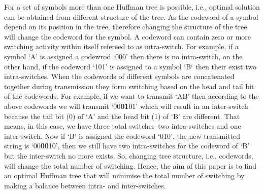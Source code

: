 \documentclass[preprint,12pt]{elsarticle}
\begin{document}
For a set of symbols more than one Huffman tree is possible, i.e., optimal solution can be obtained from different structure of the tree. As the codeword of a symbol depend on its position in the tree, therefore changing the structure of the tree will change the codeword for the symbol. A codeword can contain zero or more switching activity within itself refereed to as intra-switch. For example, if a symbol `A' is assigned a codewrod `000' then there is no intra-switch, on the other hand, if the codeword `101' is assigned to a symbol `B` then their exist two intra-switches. When the codewords of different symbols are concatenated together during transmission they form switching based on the head and tail bit of the codewords. For example, if we want to transmit `AB' then according to the above codewords we will transmit `00\textbf{01}01' which will result in an inter-switch because the tail bit (0) of `A' and the head bit (1) of `B' are different. That means, in this case, we have three total switches--two intra-switches and one inter-switch. Now if `B' is assigned the codeword `010', the new transmitted string is `00\textbf{00}10', then we still have two intra-switches for the codeword of `B' but the inter-switch no more exists. So, changing tree structure, i.e., codewords, will change the total number of switching. Hence, the aim of this paper is to find an optimal Huffman tree that will minimise the total number of switching by making a balance between intra- and inter-switches.
\end{document}

